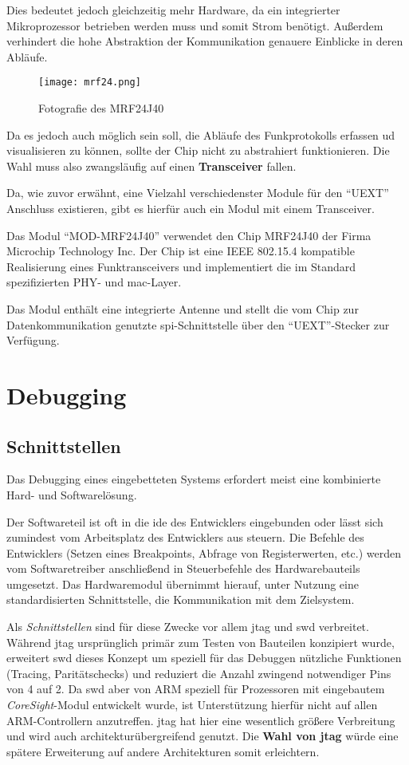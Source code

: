 Dies bedeutet jedoch gleichzeitig mehr Hardware, da ein integrierter
Mikroprozessor betrieben werden muss und somit Strom benötigt.
Außerdem verhindert die hohe Abstraktion der Kommunikation genauere Einblicke in
deren Abläufe.

\begin{figure}[!ht]
\centering
\texttt{[image: mrf24.png]}\\
\caption{Fotografie des MRF24J40}{}
\end{figure}

Da es jedoch auch möglich sein soll, die Abläufe des Funkprotokolls erfassen ud
visualisieren zu können, sollte der Chip nicht zu abstrahiert funktionieren. Die
Wahl muss also zwangsläufig auf einen \textbf{Transceiver} fallen.

Da, wie zuvor erwähnt, eine Vielzahl verschiedenster Module für den "`UEXT"'
Anschluss existieren, gibt es hierfür auch ein Modul mit einem Transceiver.

Das Modul "`MOD-MRF24J40"' verwendet den Chip MRF24J40\cite{MRF} der Firma
Microchip Technology Inc. Der Chip ist eine IEEE 802.15.4\cite{IEEE01}
kompatible Realisierung eines Funktransceivers und implementiert die im Standard
spezifizierten PHY- und \gls{mac}-Layer.

Das Modul enthält eine integrierte Antenne und stellt die vom Chip zur
Datenkommunikation genutzte \gls{spi}-Schnittstelle über den "`UEXT"'-Stecker
zur Verfügung.
\section{Debugging}
\subsection{Schnittstellen}
Das Debugging eines eingebetteten Systems erfordert meist eine kombinierte Hard-
und Softwarelösung.

Der Softwareteil ist oft in die \gls{ide} des Entwicklers eingebunden oder lässt
sich zumindest vom Arbeitsplatz des Entwicklers aus steuern. Die Befehle des
Entwicklers (Setzen eines Breakpoints, Abfrage von Registerwerten, etc.) werden
vom Softwaretreiber anschließend in Steuerbefehle des Hardwarebauteils
umgesetzt. Das Hardwaremodul übernimmt hierauf, unter Nutzung eine
standardisierten Schnittstelle, die Kommunikation mit dem Zielsystem.

Als \emph{Schnittstellen} sind für diese Zwecke vor allem \gls{jtag} und
\gls{swd} verbreitet. Während \gls{jtag} ursprünglich primär zum Testen von Bauteilen
konzipiert wurde, erweitert \gls{swd} dieses Konzept um speziell für das
Debuggen nützliche Funktionen (Tracing, Paritätschecks) und reduziert die Anzahl
zwingend notwendiger Pins von 4 auf 2. Da \gls{swd} aber von
ARM speziell für Prozessoren mit eingebautem \emph{CoreSight}-Modul entwickelt
wurde, ist Unterstützung hierfür nicht auf allen ARM-Controllern anzutreffen. \gls{jtag}
hat hier eine wesentlich größere Verbreitung und wird auch
architekturübergreifend genutzt. Die \textbf{Wahl von \gls{jtag}} würde eine
spätere Erweiterung auf andere Architekturen somit erleichtern.
